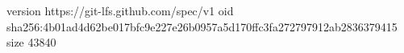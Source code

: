 version https://git-lfs.github.com/spec/v1
oid sha256:4b01ad4d62be017bfc9e227e26b0957a5d170ffc3fa272797912ab2836379415
size 43840
